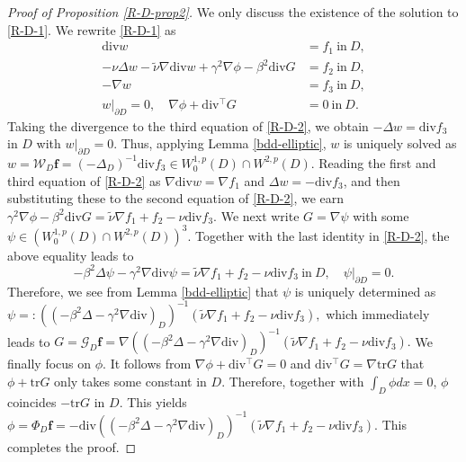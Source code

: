 \documentclass[dvipdfmx,12pt]{article}
\begin{document}
\begin{proof}[Proof of Proposition \ref{R-D-prop2}]
We only discuss the existence of the solution to \eqref{R-D-1}.  We rewrite \eqref{R-D-1} as
\begin{equation}
\label{R-D-2}
\begin{aligned}
\mathrm{div} w&=f_1~\mathrm{in}~D, \\
-\nu\Delta w-\tilde{\nu}\nabla\mathrm{div}w+\gamma^2\nabla\phi-\beta^2\mathrm{div}G&=f_2~\mathrm{in}~D, \\
-\nabla w&=f_3~\mathrm{in}~D, \\
w|_{\partial D}=0, \quad
\nabla\phi+\mathrm{div}{}^\top G&=0~\mathrm{in}~D.
\end{aligned}
\end{equation}
Taking the divergence to the third equation of \eqref{R-D-2}, we obtain $-\Delta w=\mathrm{div}f_3$ in $D$  with $w|_{\partial D}=0$. Thus, applying Lemma \ref{bdd-elliptic}, $w$ is uniquely solved as $w=\mathcal{W}_D\mathbf{f}=(-\Delta_{D})^{-1}\mathrm{div}f_3\in W_0^{1,p}(D)\cap W^{2,p}(D) $. Reading the first and third equation of \eqref{R-D-2} as $\nabla\mathrm{div} w=\nabla f_1$ and $\Delta w=-\mathrm{div} f_3$, and then substituting these to the second equation of \eqref{R-D-2}, we earn $\gamma^2\nabla \phi-\beta^2\mathrm{div}G=\tilde{\nu} \nabla f_1+f_2-\nu\mathrm{div} f_3.$
We next write $G=\nabla \psi$ with some $\psi\in (W_0^{1,p}(D)\cap W^{2,p}(D))^3$. Together with the last identity in \eqref{R-D-2}, the above equality leads to
\[
-\beta^2\Delta \psi-\gamma^2\nabla\mathrm{div} \psi=\tilde{\nu} \nabla f_1+f_2-\nu\mathrm{div} f_3~\mathrm{in}~D,\quad \psi|_{\partial D}=0.
\]
Therefore, we see from Lemma \ref{bdd-elliptic} that $\psi$ is uniquely determined as 
$
\psi=:((-\beta^2\Delta-\gamma^2\nabla\mathrm{div})_D)^{-1}(\tilde{\nu} \nabla f_1+f_2-\nu\mathrm{div} f_3),
$
which immediately leads to
$
G=\mathcal{G}_D \mathbf{f}=\nabla((-\beta^2\Delta-\gamma^2\nabla\mathrm{div})_D)^{-1}(\tilde{\nu}\nabla f_1+f_2-\nu\mathrm{div} f_3).
$ 
We finally focus on $\phi$. It follows from $\nabla \phi+\mathrm{div}{}^\top G=0$ and $\mathrm{div}{}^\top G=\nabla \mathrm{tr}G$ that $\phi+\mathrm{tr}G$ only takes some constant in $D$. Therefore, together with $\int_D \phi dx=0$, $\phi$ coincides $-\mathrm{tr} G$ in $D$. This yields
$
\phi=\Phi_D \mathbf{f}=-\mathrm{div}((-\beta^2\Delta-\gamma^2\nabla\mathrm{div})_D)^{-1}(\tilde{\nu} \nabla f_1+f_2-\nu\mathrm{div} f_3).
$ 
This completes the proof.
\end{proof}
\end{document}
